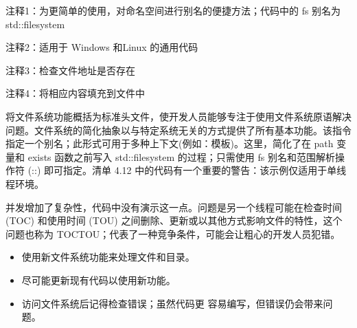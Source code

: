 {\footnotesize
注释1：为更简单的使用，对命名空间进行别名的便捷方法；代码中的 fs 别名为 std::filesystem

注释2：适用于 Windows 和Linux 的通用代码

注释3：检查文件地址是否存在

注释4：将相应内容填充到文件中
}

将文件系统功能概括为标准头文件，使开发人员能够专注于使用文件系统原语解决问题。文件系统的简化抽象以与特定系统无关的方式提供了所有基本功能。该指令指定一个别名；此形式可用于多种上下文(例如：模板)。这里，简化了在 path 变量和 exists 函数之前写入 std::filesystem 的过程；只需使用 fs 别名和范围解析操作符 (::) 即可指定。清单 4.12 中的代码有一个重要的警告：该示例仅适用于单线程环境。

并发增加了复杂性，代码中没有演示这一点。问题是另一个线程可能在检查时间 (TOC) 和使用时间 (TOU) 之间删除、更新或以其他方式影响文件的特性，这个问题也称为 TOCTOU；代表了一种竞争条件，可能会让粗心的开发人员犯错。


\begin{itemize}
\item
使用新文件系统功能来处理文件和目录。

\item
尽可能更新现有代码以使用新功能。

\item
访问文件系统后记得检查错误；虽然代码更 容易编写，但错误仍会带来问题。
\end{itemize}














